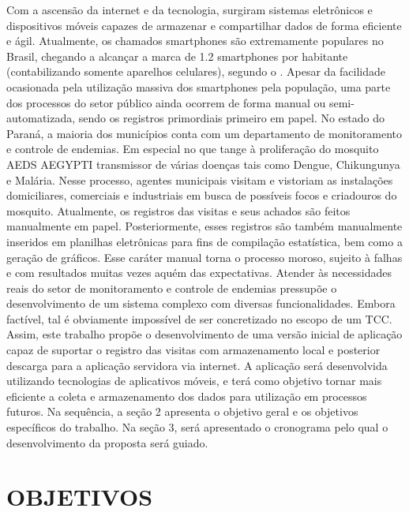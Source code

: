 Com a ascensão da internet e da tecnologia, surgiram sistemas eletrônicos e dispositivos móveis capazes de armazenar e compartilhar dados de forma eficiente e ágil. Atualmente, os chamados smartphones são extremamente populares no Brasil, chegando a alcançar a marca de 1.2 smartphones por habitante (contabilizando somente aparelhos celulares), segundo o \cite{FGVcia}. Apesar da facilidade ocasionada pela utilização massiva dos smartphones pela população, uma parte dos processos do setor público ainda ocorrem de forma manual ou semi-automatizada, sendo os registros primordiais primeiro em papel.
No estado do Paraná, a maioria dos municípios conta com um departamento de monitoramento e controle de endemias. Em especial no que tange à proliferação do mosquito AEDS AEGYPTI transmissor de várias doenças tais como Dengue, Chikungunya e Malária. Nesse processo, agentes municipais visitam e vistoriam as instalações domiciliares, comerciais e industriais em busca de possíveis focos  e criadouros do mosquito. Atualmente, os registros das visitas e seus achados são feitos manualmente em papel. Posteriormente, esses registros são também manualmente inseridos em planilhas eletrônicas para fins de compilação estatística, bem como a geração de gráficos. Esse caráter manual torna o processo moroso, sujeito à falhas e com resultados muitas vezes aquém das expectativas.
Atender às necessidades reais do setor de monitoramento e controle de endemias pressupõe o desenvolvimento de um sistema complexo com diversas funcionalidades. Embora factível, tal é obviamente impossível de ser concretizado no escopo de um TCC. Assim,  este trabalho propõe o desenvolvimento de uma versão inicial de aplicação capaz de suportar o registro das visitas com armazenamento local e posterior descarga para a aplicação servidora via internet. A aplicação será desenvolvida utilizando tecnologias de aplicativos móveis, e terá como objetivo tornar mais eficiente a coleta e armazenamento dos dados para utilização em processos futuros. Na sequência, a seção 2 apresenta o objetivo geral e os objetivos específicos do trabalho. Na seção 3, será apresentado o cronograma pelo qual o desenvolvimento da proposta será guiado. 

\newpage

\chapter{OBJETIVOS}
\label{chap:objetivos}

